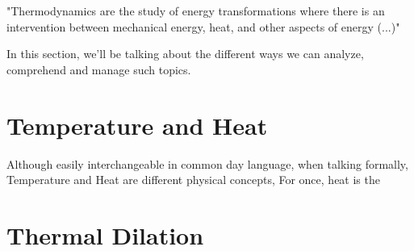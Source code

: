 \documentclass[11pt,fleqn]{book} %
\begin{document}
"Thermodynamics are the study of energy transformations 
where there is an intervention between mechanical energy, 
heat, and other aspects of energy (...)" \cite{1}

In this section, we'll be talking about the different ways we can analyze, comprehend and manage such topics.

\section{Temperature and Heat}
Although easily interchangeable in common day language, when talking formally, Temperature and Heat
are different physical concepts, For once, heat is the 

\section{Thermal Dilation}


\printbibliography
\end{document}
